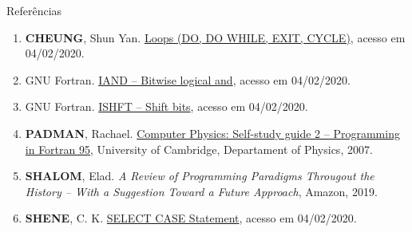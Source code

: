 \begin{frame}[fragile]{Referências}

    \begin{enumerate}

        \item \textbf{CHEUNG}, Shun Yan. \href{http://www.mathcs.emory.edu/~cheung/Courses/561/Syllabus/5-Fortran/do.html}{Loops (DO, DO WHILE, EXIT, CYCLE)}, acesso em 04/02/2020.

        \item GNU Fortran. \href{https://gcc.gnu.org/onlinedocs/gfortran/IAND.html#IAND}{IAND -- Bitwise logical and}, acesso em 04/02/2020.

        \item GNU Fortran. \href{https://gcc.gnu.org/onlinedocs/gfortran/IAND.html#ISHFT}{ISHFT -- Shift bits}, acesso em 04/02/2020.

        \item \textbf{PADMAN}, Rachael. \href{http://www.mrao.cam.ac.uk/~rachael/compphys/SelfStudyF95.pdf}{Computer Physics: Self-study guide 2 -- Programming in Fortran 95}, University of 
        Cambridge, Departament of Physics, 2007.

        \item \textbf{SHALOM}, Elad. \textit{A Review of Programming Paradigms Througout the 
            History -- With a Suggestion Toward a Future Approach}, Amazon, 2019.

        \item \textbf{SHENE}, C. K. \href{https://pages.mtu.edu/~shene/COURSES/cs201/NOTES/chap03/select.html}{SELECT CASE Statement}, acesso em 04/02/2020. 

 
    \end{enumerate}

\end{frame}
